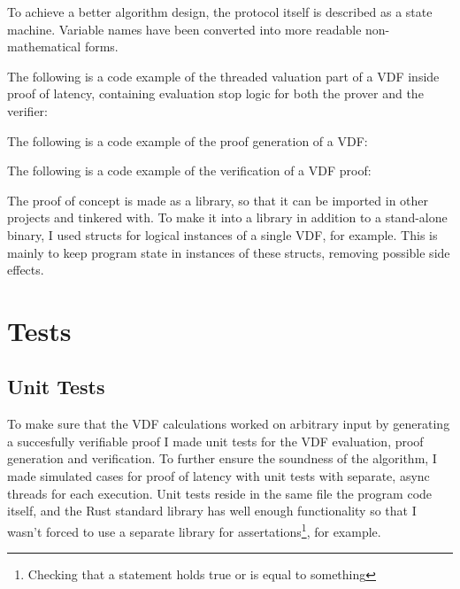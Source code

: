 To achieve a better algorithm design, the protocol itself is described as a state machine. Variable names have been converted into more readable non-mathematical forms.

The following is a code example of the threaded valuation part of a VDF inside proof of latency, containing evaluation stop logic for both the prover and the verifier:

The following is a code example of the proof generation of a VDF:

The following is a code example of the verification of a VDF proof:

The proof of concept is made as a library, so that it can be imported in other projects and tinkered with. To make it into a library in addition to a stand-alone binary, I used structs for logical instances of a single VDF, for example. This is mainly to keep program state in instances of these structs, removing possible side effects.


\section{Tests}
\subsection{Unit Tests}
To make sure that the VDF calculations worked on arbitrary input by generating a succesfully verifiable proof I made unit tests for the VDF evaluation, proof generation and verification. To further ensure the soundness of the algorithm, I made simulated cases for proof of latency with unit tests with separate, async threads for each execution. Unit tests reside in the same file the program code itself, and the Rust standard library has well enough functionality so that I wasn't forced to use a separate library for assertations\footnote{Checking that a statement holds true or is equal to something}, for example.

